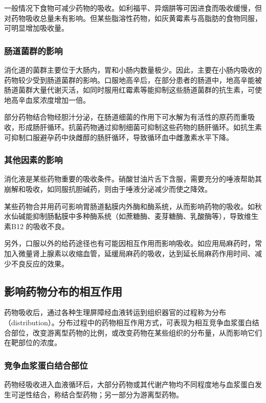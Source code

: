 一般情况下食物可减少药物的吸收。如利福平、异烟肼等可因进食而吸收缓慢，但对药物吸收总量未有影响。但某些脂溶性药物，如灰黄霉素与高脂肪的食物同服，可明显增加吸收量。

\subsubsection{肠道菌群的影响}

消化道的菌群主要位于大肠内，胃和小肠内数量极少。因此，主要在小肠内吸收的药物较少受到肠道菌群的影响。口服地高辛后，在部分患者的肠道中，地高辛能被肠道菌群大量代谢灭活，如同时服用红霉素等能抑制这些肠道菌群的抗生素，可使地高辛血浆浓度增加一倍。

部分药物结合物经胆汁分泌，在肠道细菌的作用下可水解为有活性的原药而重吸收，形成肠肝循环。抗菌药物通过抑制细菌可抑制这些药物的肠肝循环。如抗生素可抑制口服避孕药中炔雌醇的肠肝循环，导致循环血中雌激素水平下降。

\subsubsection{其他因素的影响}

消化液是某些药物重要的吸收条件。硝酸甘油片舌下含服，需要充分的唾液帮助其崩解和吸收，如同服抗胆碱药，则由于唾液分泌减少而使之降效。

某些药物合并用药可影响胃肠道黏膜内外酶和酶系统，从而影响药物的吸收。如秋水仙碱能抑制肠黏膜中多种酶系统（如蔗糖酶、麦芽糖酶、乳酸酶等），导致维生素B{12}
的吸收不良。

另外，口服以外的给药途径也有可能因相互作用而影响吸收。如应用局麻药时，常加入微量肾上腺素以收缩血管，延缓局麻药的吸收，达到延长局麻药作用时间、减少不良反应的效果。

\subsection{影响药物分布的相互作用}

药物吸收后，通过各种生理屏障经血液转运到组织器官的过程称为分布（distribution）。分布过程中的药物相互作用方式，可表现为相互竞争血浆蛋白结合部位，改变游离型药物的比例，或改变药物在某些组织的分布量，从而影响它们在靶部位的浓度。

\subsubsection{竞争血浆蛋白结合部位}

药物经吸收进入血液循环后，大部分药物或其代谢产物均不同程度地与血浆蛋白发生可逆性结合，称结合型药物；另一部分为游离型药物。

